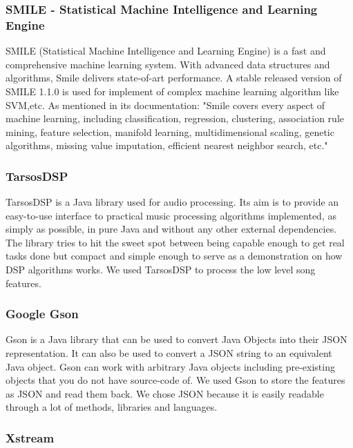 \subsubsection{SMILE - Statistical Machine Intelligence and Learning Engine}

SMILE (Statistical Machine Intelligence and Learning Engine) is a fast and comprehensive machine learning system. With advanced data structures and algorithms, Smile delivers state-of-art performance.
A stable released version of SMILE 1.1.0 is used for implement of complex machine learning algorithm like SVM,etc.
As mentioned in its documentation:
"Smile covers every aspect of machine learning, including classification, regression, clustering, association rule mining, feature selection, manifold learning, multidimensional scaling, genetic algorithms, missing value imputation, efficient nearest neighbor search, etc."

\subsubsection{TarsosDSP}

    TarsosDSP is a Java library used for audio processing. 
    Its aim is to provide an easy-to-use interface to practical music processing algorithms implemented, as simply as possible, in pure Java and without any other external dependencies. 
    The library tries to hit the sweet spot between being capable enough to get real tasks done but compact and simple enough to serve as a demonstration on how DSP algorithms works.
    We used TarsosDSP to process the low level song features.

\subsubsection{Google Gson}

Gson is a Java library that can be used to convert Java Objects into their JSON representation. 
It can also be used to convert a JSON string to an equivalent Java object. 
Gson can work with arbitrary Java objects including pre-existing objects that you do not have source-code of.  
We used Gson to store the features as JSON and read them back. 
We chose JSON because it is easily readable through a lot of methods, libraries and languages.

\subsubsection{Xstream}

